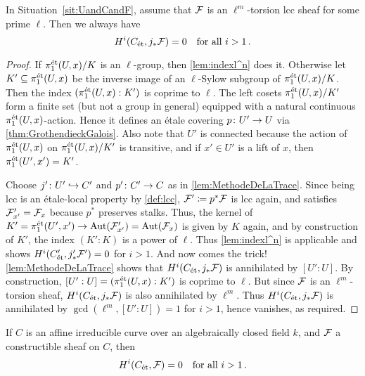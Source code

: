 \begin{lem}\label{lem:Hij_*F=0}
	In Situation~\cref{sit:UandCandF}, assume that $\mathcal{F}$ is an $\ell^m$-torsion lcc sheaf for some prime $\ell$. Then we always have
	\begin{equation*}
		H^i(C_{\mathrm{\acute{e}t}},j_*\mathcal{F})=0\quad\text{for all }i>1\,.
	\end{equation*}
\end{lem}
\begin{proof}
	If $\pi_1^{\mathrm{\acute{e}t}}(U,x)/K$ is an $\ell$-group, then \cref{lem:indexl^n} does it. Otherwise let $K'\subseteq \pi_1^{\mathrm{\acute{e}t}}(U,x)$ be the inverse image of an $\ell$-Sylow subgroup of $\pi_1^{\mathrm{\acute{e}t}}(U,x)/K$. Then the index $(\pi_1^{\mathrm{\acute{e}t}}(U,x):K')$ is coprime to $\ell$. The left cosets $\pi_1^{\mathrm{\acute{e}t}}(U,x)/K'$ form a finite set (but not a group in general) equipped with a natural continuous $\pi_1^{\mathrm{\acute{e}t}}(U,x)$-action. Hence it defines an étale covering $p\colon U'\morphism U$ via \cref{thm:GrothendieckGalois}. Also note that $U'$ is connected because the action of $\pi_1^{\mathrm{\acute{e}t}}(U,x)$ on $\pi_1^{\mathrm{\acute{e}t}}(U,x)/K'$ is transitive, and if $x'\in U'$ is a lift of $x$, then $\pi_1^{\mathrm{\acute{e}t}}(U',x')=K'$.
	
	Choose $j'\colon U'\monomorphism C'$ and $p'\colon C'\morphism C$ as in \cref{lem:MethodeDeLaTrace}. Since being lcc is an étale-local property by \cref{def:lcc}, $\mathcal{F}'\coloneqq p^*\mathcal{F}$ is lcc again, and satisfies $\mathcal{F}'_{x'}=\mathcal{F}_x$ because $p^*$ preserves stalks. Thus, the kernel of $K'=\pi_1^\et(U',x')\morphism \Aut(\Ff'_{x'})=\Aut(\Ff_x)$ is given by $K$ again, and by construction of $K'$, the index $(K':K)$ is a power of $\ell$. Thus \cref{lem:indexl^n} is applicable and shows $H^i(C'_{\mathrm{\acute{e}t}},j'_*\mathcal{F}')=0$ for $i>1$. And now comes the trick! \cref{lem:MethodeDeLaTrace} shows that $H^i(C_{\mathrm{\acute{e}t}},j_*\mathcal{F})$ is annihilated by $[U':U]$. By construction, $[U':U]=(\pi_1^{\mathrm{\acute{e}t}}(U,x):K')$ is coprime to $\ell$. But since $\mathcal{F}$ is an $\ell^m$-torsion sheaf, $H^i(C_{\mathrm{\acute{e}t}},j_*\mathcal{F})$ is also annihilated by $\ell^m$. Thus $H^i(C_{\mathrm{\acute{e}t}},j_*\mathcal{F})$ is annihilated by $\gcd(\ell^m,[U':U])=1$ for $i>1$, hence vanishes, as required.
\end{proof}
\begin{lem}\label{lem:HiCtorsion=0}
	If $C$ is an affine irreducible curve over an algebraically closed field $k$, and $\mathcal{F}$ a constructible sheaf on $C$, then
	\begin{equation*}
		H^i(C_{\mathrm{\acute{e}t}},\mathcal{F})=0\quad\text{for all }i>1\,.
	\end{equation*}
\end{lem}
